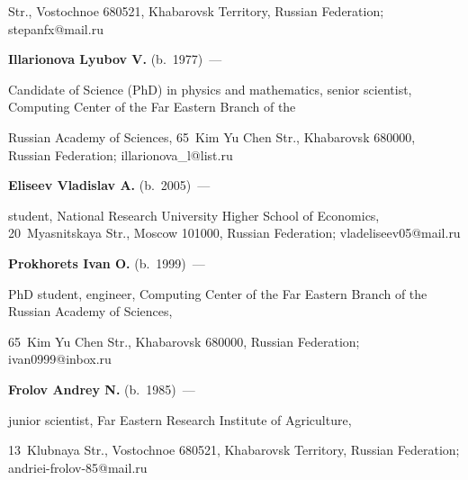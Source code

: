 Str., Vostochnoe 680521, Khabarovsk Territory, Russian Federation; \mbox{stepanfx@mail.ru}



\vspace*{3pt}



\noindent

\textbf{Illarionova Lyubov V.} (b.\ 1977)~--- 

Candidate of Science (PhD) in physics and mathematics, senior scientist, Computing Center of the Far Eastern Branch of the 

Russian Academy of Sciences, 65~Kim Yu Chen Str., Khabarovsk 680000, Russian Federation; \mbox{illarionova\_l@list.ru}



\vspace*{3pt}



\noindent

\textbf{Eliseev Vladislav A.} (b.\ 2005)~--- 

student, National Research University Higher School of Economics, 20~Myasnitskaya Str., Moscow 101000, Russian Federation; \mbox{vladeliseev05@mail.ru}





\vspace*{3pt}



\noindent

\textbf{Prokhorets Ivan O.} (b.\ 1999)~--- 

PhD student, engineer, Computing Center of the Far Eastern Branch of the Russian Academy of Sciences, 

65~Kim Yu Chen Str., Khabarovsk 680000, Russian Federation; \mbox{ivan0999@inbox.ru}





\vspace*{3pt}



\noindent

\textbf{Frolov Andrey N.} (b.\ 1985)~--- 

junior scientist, Far Eastern Research Institute of Agriculture, 

13~Klubnaya Str., Vostochnoe 680521, Khabarovsk Territory, Russian Federation; \mbox{andriei-frolov-85@mail.ru}





